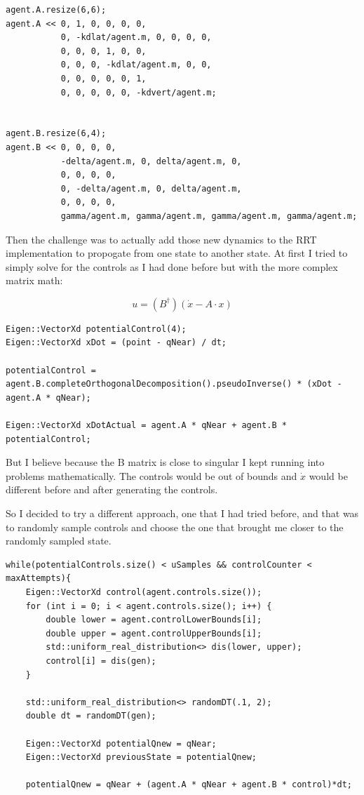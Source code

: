 \documentclass{article}
\begin{document}
\begin{lstlisting}[style=cppstyle]
agent.A.resize(6,6);
agent.A << 0, 1, 0, 0, 0, 0,
           0, -kdlat/agent.m, 0, 0, 0, 0,
           0, 0, 0, 1, 0, 0,
           0, 0, 0, -kdlat/agent.m, 0, 0,
           0, 0, 0, 0, 0, 1,
           0, 0, 0, 0, 0, -kdvert/agent.m;


agent.B.resize(6,4);
agent.B << 0, 0, 0, 0,
           -delta/agent.m, 0, delta/agent.m, 0,
           0, 0, 0, 0,
           0, -delta/agent.m, 0, delta/agent.m,
           0, 0, 0, 0,
           gamma/agent.m, gamma/agent.m, gamma/agent.m, gamma/agent.m;
\end{lstlisting}

Then the challenge was to actually add those new dynamics to the RRT implementation to propogate from one state to another state.
At first I tried to simply solve for the controls as I had done before but with the more complex matrix math:

\[
u = (B^{\dagger})(\dot{x} - A \cdot x)
\]

\begin{lstlisting}[style=cppstyle]
Eigen::VectorXd potentialControl(4);
Eigen::VectorXd xDot = (point - qNear) / dt;

potentialControl = agent.B.completeOrthogonalDecomposition().pseudoInverse() * (xDot - agent.A * qNear); 

Eigen::VectorXd xDotActual = agent.A * qNear + agent.B * potentialControl;
\end{lstlisting}

But I believe because the B matrix is close to singular I kept running into problems mathematically.
The controls would be out of bounds and $\dot{x}$ would be different before and after generating the controls.

So I decided to try a different approach, one that I had tried before, and that was to randomly sample controls and choose the one that brought me closer to the randomly sampled state.

\begin{lstlisting}[style=cppstyle]
while(potentialControls.size() < uSamples && controlCounter < maxAttempts){
    Eigen::VectorXd control(agent.controls.size());
    for (int i = 0; i < agent.controls.size(); i++) {
        double lower = agent.controlLowerBounds[i];
        double upper = agent.controlUpperBounds[i];
        std::uniform_real_distribution<> dis(lower, upper);
        control[i] = dis(gen);
    }

    std::uniform_real_distribution<> randomDT(.1, 2);
    double dt = randomDT(gen);

    Eigen::VectorXd potentialQnew = qNear;
    Eigen::VectorXd previousState = potentialQnew;

    potentialQnew = qNear + (agent.A * qNear + agent.B * control)*dt; 
\end{lstlisting}
\end{document}
